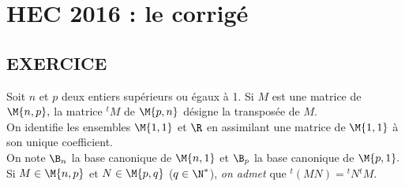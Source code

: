 \chapter*{HEC 2016 : le corrigé}
  
%

\section*{EXERCICE} %

\noindent 
Soit $n$ et $p$ deux entiers supérieurs ou égaux à 1.
Si $M$ est une matrice de $\M{n,p},$ la matrice ${}^t{}M$ de 
$\M{p,n}$ désigne la transposée de $M.$\\
On identifie les ensembles $\M{1,1}$ et $\R$ en assimilant 
une matrice de $\M{1,1}$ à son unique coefficient.\\
On note $\B_n$ la base canonique de $\M{n,1}$ et 
$\B_p$ la base canonique de $\M{p,1}.$\\
Si $M \in \M{n,p}$ et $N \in \M{p,q}$ ($q 
\in \N^*$), {\it on admet} que 
${}^t{}{(MN)}={}^{t}{}{N}{}^{t}{}{M}$.


